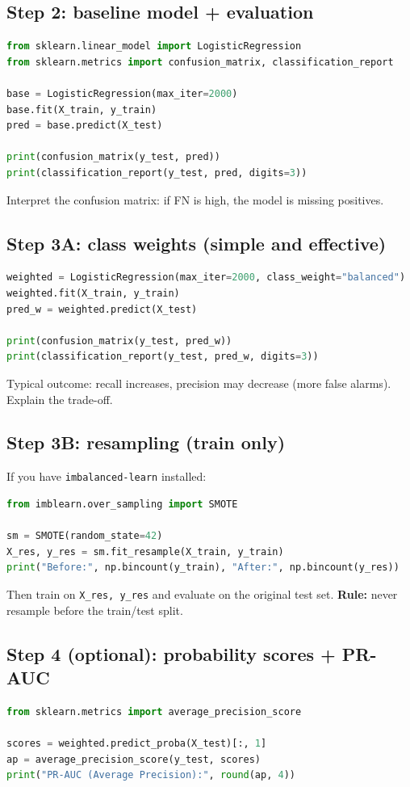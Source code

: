 \documentclass[11pt]{article}
\begin{document}
\subsection{Step 2: baseline model + evaluation}
\begin{lstlisting}[language=Python]
from sklearn.linear_model import LogisticRegression
from sklearn.metrics import confusion_matrix, classification_report

base = LogisticRegression(max_iter=2000)
base.fit(X_train, y_train)
pred = base.predict(X_test)

print(confusion_matrix(y_test, pred))
print(classification_report(y_test, pred, digits=3))
\end{lstlisting}
Interpret the confusion matrix: if FN is high, the model is missing positives.

\subsection{Step 3A: class weights (simple and effective)}
\begin{lstlisting}[language=Python]
weighted = LogisticRegression(max_iter=2000, class_weight="balanced")
weighted.fit(X_train, y_train)
pred_w = weighted.predict(X_test)

print(confusion_matrix(y_test, pred_w))
print(classification_report(y_test, pred_w, digits=3))
\end{lstlisting}
Typical outcome: recall increases, precision may decrease (more false alarms). Explain the trade-off.

\subsection{Step 3B: resampling (train only)}
If you have \texttt{imbalanced-learn} installed:
\begin{lstlisting}[language=Python]
from imblearn.over_sampling import SMOTE

sm = SMOTE(random_state=42)
X_res, y_res = sm.fit_resample(X_train, y_train)
print("Before:", np.bincount(y_train), "After:", np.bincount(y_res))
\end{lstlisting}
Then train on \texttt{X\_res, y\_res} and evaluate on the original test set.
\textbf{Rule:} never resample before the train/test split.

\subsection{Step 4 (optional): probability scores + PR-AUC}
\begin{lstlisting}[language=Python]
from sklearn.metrics import average_precision_score

scores = weighted.predict_proba(X_test)[:, 1]
ap = average_precision_score(y_test, scores)
print("PR-AUC (Average Precision):", round(ap, 4))
\end{lstlisting}
\end{document}
